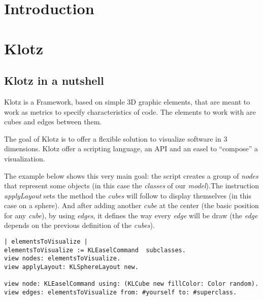 \documentclass[runningheads]{llncs}
\newcommand{\seclabel}[1]{\label{sec:#1}}
\begin{document}

\section{Introduction} \seclabel{introduction}


\section{Klotz} \seclabel{klotz}

\subsection{Klotz in a nutshell} \seclabel{nutshell}
Klotz is a Framework, based on simple 3D graphic elements,
that are meant to work as metrics to specify characteristics of
code. The elements to work with are cubes and edges between them.

The goal of Klotz is to offer a flexible solution to visualize software 
in 3 dimensions. Klotz offer a scripting language, an API and an easel to 
``compose'' a visualization. 

The example below shows this very main goal: the script creates a group of
\emph{nodes} that represent some objects (in this case the \emph{classes} 
of our \emph{model}).The instruction \emph{applyLayout} sets the method 
the \emph{cubes} will follow to display themselves (in this case on a 
sphere). And after adding another \emph{cube} at the center (the basic 
position for any \emph{cube}), by using \emph{edges}, it defines the way 
every \emph{edge} will be draw (the \emph{edge} depends on the previous 
definition of the \emph{cubes}).

\begin{lstlisting}
| elementsToVisualize |
elementsToVisualize := KLEaselCommand  subclasses.
view nodes: elementsToVisualize.
view applyLayout: KLSphereLayout new.

view node: KLEaselCommand using: (KLCube new fillColor: Color random).
view edges: elementsToVisualize from: #yourself to: #superclass.   
\end{lstlisting}
\end{document}
